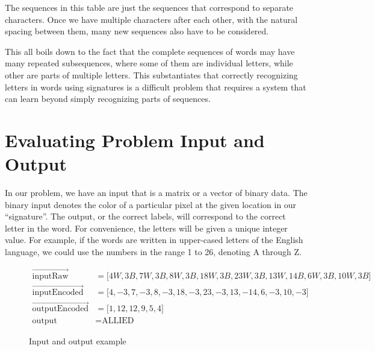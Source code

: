 The sequences in this table are just the sequences that correspond to separate characters. Once we have multiple characters after each other, with the natural spacing between them, many new sequences also have to be considered. 

This all boils down to the fact that the complete sequences of words may have many repeated subsequences, where some of them are individual letters, while other are parts of multiple letters. This substantiates that correctly recognizing letters in words using signatures is a difficult problem that requires a system that can learn beyond simply recognizing parts of sequences.


\section{Evaluating Problem Input and Output}
\label{sec:evaluating_problem_input_and_output}
In our problem, we have an input that is a matrix or a vector of binary data. The binary input denotes the color of a particular pixel at the given location in our ``signature''. The output, or the correct labels, will correspond to the correct letter in the word. For convenience, the letters will be given a unique integer value. For example, if the words are written in upper-cased letters of the English language, we could use the numbers in the range 1 to 26, denoting A through Z.

\begin{figure}[ht]
    \renewcommand\figurename{Example}
    \begin{equation*}
        \begin{aligned}
           \vec{\text{inputRaw}}               &= \lbrack 4W, 3B, 7W, 3B, 8W, 3B, 18W, 3B, 23W, 3B, 13W, 14B, 6W, 3B, 10W, 3B \rbrack \\
           \vec{\text{inputEncoded}}           &= \lbrack 4, -3, 7, -3, 8, -3, 18, -3, 23, -3, 13, -14, 6, -3, 10, -3 \rbrack \\
           \vec{\text{outputEncoded}}          &= \lbrack 1, 12, 12, 9, 5, 4 \rbrack \\
           \text{output}                       &= \text{ALLIED}
        \end{aligned}
    \end{equation*}
    \caption{Input and output example}
    \label{eq:input_output_example}
\end{figure}

